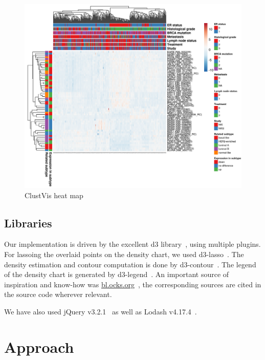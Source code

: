 \documentclass{vgtc} %
\begin{document}
\begin{figure}[bt]
    \centering
    \includegraphics[width=\columnwidth]{clustvis-heat}
    \caption{ClustVis heat map}
    \label{fig:clustvis-heatmap}
\end{figure}

\subsection{Libraries}

Our implementation is driven by the excellent d3 library~\cite{d3}, using
multiple plugins. For lassoing the overlaid points on the density chart, we
used d3-lasso~\cite{d3-lasso}. The density estimation and contour computation
is done by d3-contour~\cite{d3-contour}. The legend of the density chart is
generated by d3-legend~\cite{d3-legend}. An important source of inspiration and
know-how was \url{bl.ocks.org}~\cite{blocks}, the corresponding sources are
cited in the source code wherever relevant.

We have also used jQuery v3.2.1~\cite{jquery} as well as Lodash
v4.17.4~\cite{lodash}.

\section{Approach} %
\end{document}
